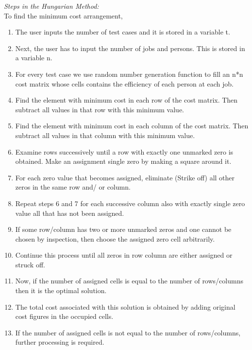\documentclass[conference]{IEEEtran}
\begin{document}
\emph{Steps in the Hungarian Method:}\\
To find the minimum cost arrangement,
\begin{enumerate}
\item The user inputs the number of test cases and it is stored in a variable t.
\item Next, the user has to input the number of jobs and persons. This is stored in a variable n.
\item For every test case we use random number generation function to fill an n*n cost matrix whose cells contains the efficiency of each person at each job.
\item Find the element with minimum cost in each row of the cost matrix. Then subtract all values in that row with this minimum value.
\item Find the element with minimum cost in each column of the cost matrix. Then subtract all values in that column with this minimum value.
\item Examine rows successively until a row with exactly one unmarked zero is obtained. Make an assignment single zero by making a square around it.
\item For each zero value that becomes assigned, eliminate (Strike off) all other zeros in the same row and/ or column.
\item Repeat steps 6 and 7 for each successive column also with exactly single zero value all that has not been assigned.
\item If some row/column has two or more unmarked zeros and one cannot be chosen by inspection, then choose the assigned zero cell arbitrarily.
\item Continue this process until all zeros in row column are either assigned or struck off.
\item Now, if the number of assigned cells is equal to the number of rows/columns then it is the optimal solution. 
\item The total cost associated with this solution is obtained by adding original cost figures in the occupied cells.
\item If the number of assigned cells is not equal to the number of rows/columns, further processing is required.

\end{enumerate}
\end{document}
